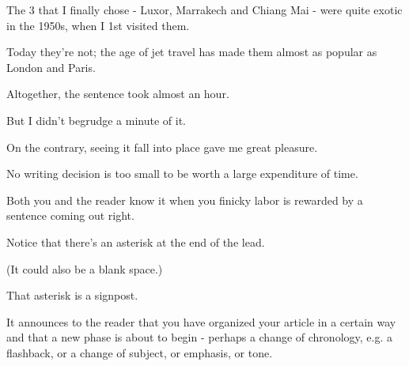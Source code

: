 \documentclass{book}
\numberwithin{equation}{section}
\begin{document}
The 3 that I finally chose - Luxor, Marrakech and Chiang Mai - were quite exotic in the 1950s, when I 1st visited them.

Today they're not; the age of jet travel has made them almost as popular as London and Paris.

%
Altogether, the sentence took almost an hour.

But I didn't begrudge a minute of it.

On the contrary, seeing it fall into place gave me great pleasure.

No writing decision is too small to be worth a large expenditure of time.

Both you and the reader know it when you finicky labor is rewarded by a sentence coming out right.

%
Notice that there's an asterisk at the end of the lead.

(It could also be a blank space.)

That asterisk is a signpost.

It announces to the reader that you have organized your article in a certain way and that a new phase is about to begin - perhaps a change of chronology, e.g. a flashback, or a change of subject, or emphasis, or tone.
\end{document}
